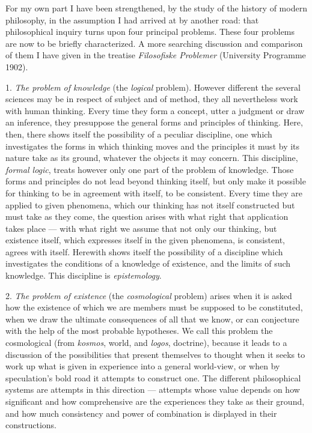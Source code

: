 \documentclass[12pt,a4paper]{book}
\newcommand{\opage}[1]{\marginnote{\footnotesize\textit{[#1]}}}
\begin{document}
For my own part I have been strengthened, by the study of the history of modern
philosophy, in the assumption I had arrived at by another \opage{XII}road: that
philosophical inquiry turns upon four principal problems. These four problems
are now to be briefly characterized. A more searching discussion and comparison
of them I have given in the treatise \textit{Filosofiske Problemer} (University
Programme 1902).

\medskip

1. \emph{The problem of knowledge} (the \emph{logical} problem). However
different the several sciences may be in respect of subject and of method, they
all nevertheless work with human thinking. Every time they form a concept, utter
a judgment or draw an inference, they presuppose the general forms and
principles of thinking. Here, then, there shows itself the possibility of a
peculiar discipline, one which investigates the forms in which thinking moves
and the principles it must by its nature take as its ground, whatever the
objects it may concern. This discipline, \emph{formal logic}, treats however
only one part of the problem of knowledge. Those forms and principles do not
lead beyond thinking itself, but only make it possible for thinking to be in
agreement with itself, to be consistent. Every time they are applied to given
phenomena, which our thinking has not itself constructed but must take as they
come, the question arises with what right that application takes place ---
with what right we assume that not only our thinking, but existence itself,
which expresses itself in the given phenomena, is consistent, agrees with
itself. Herewith shows itself the possibility of a discipline which investigates
the conditions of a knowledge of existence, and the limits of such knowledge.
This discipline is \emph{epistemology}.

2. \emph{The problem of existence} (the \emph{cosmological} problem) arises
when it is asked how the existence of which we are members must be supposed to
be constituted, when we draw the ultimate consequences of all that we know, or
can conjecture with the help of the most probable hypotheses. We call this
problem the cosmological (from \textit{kosmos}, world, and \textit{logos},
doctrine), because it leads to a discussion of the possibilities that present
themselves to thought when it seeks to work up what is given in experience into
a general world-view, or when by speculation's bold road it attempts to
construct one. The \opage{XIII}different philosophical systems are attempts in this
direction --- attempts whose value depends on how significant and how
comprehensive are the experiences they take as their ground, and how much
consistency and power of combination is displayed in their constructions.
\end{document}
